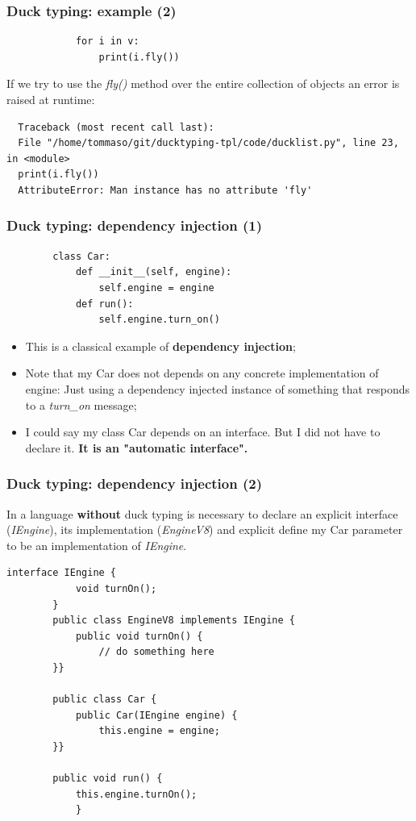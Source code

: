 \documentclass[xcolor ={table,usenames,dvipsnames}]{beamer}
\theoremstyle{definition}
\begin{document}
	\begin{frame}[fragile]
		\frametitle{Duck typing: example (2)}
		\begin{lstlisting}	
			for i in v:
				print(i.fly())
		\end{lstlisting}
		
		If we try to use the \textit{fly()} method  over the entire collection of objects an error is raised at runtime:
		
		\begin{lstlisting}
  Traceback (most recent call last):
  File "/home/tommaso/git/ducktyping-tpl/code/ducklist.py", line 23, in <module>
  print(i.fly())
  AttributeError: Man instance has no attribute 'fly'
		\end{lstlisting}
	\end{frame}

	\begin{frame}[fragile]
		\frametitle{Duck typing: dependency injection (1)}
		\begin{lstlisting}
		class Car:
			def __init__(self, engine):
				self.engine = engine
			def run():
				self.engine.turn_on()			
		\end{lstlisting}
		
		\begin{itemize}
			\item This is a classical example of \textbf{dependency injection};
			\item Note that my Car does not depends on any concrete implementation of engine: Just using a dependency injected instance of something that responds to a \textit{turn\_on} message;
			\item I could say my class Car depends on an interface. But I did not have to declare it. \textbf{It is an "automatic interface".}\\
		\end{itemize}	
	\end{frame}

	\begin{frame}[fragile]
		\frametitle{Duck typing: dependency injection (2)}
		In a language \textbf{without} duck typing is necessary to declare an explicit interface (\textit{IEngine}), its implementation (\textit{EngineV8}) and explicit define my Car parameter to be an implementation of \textit{IEngine}.	
		
		\begin{lstlisting}[basicstyle=\fontsize{2}{4}\selectfont\ttfamily\tiny]
		interface IEngine {
			void turnOn();
		}
		public class EngineV8 implements IEngine {
			public void turnOn() {
				// do something here
		}}
		
		public class Car {
			public Car(IEngine engine) {
				this.engine = engine;
		}}
		
		public void run() {
			this.engine.turnOn();
			}
		\end{lstlisting}
	\end{frame}
\end{document}
